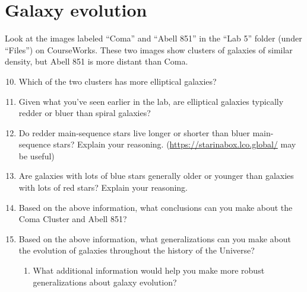 \documentclass[11pt]{article}
\begin{document}
\section{Galaxy evolution}
Look at the images labeled ``Coma'' and ``Abell 851'' in the ``Lab 5'' folder (under ``Files'') on CourseWorks. These two images show clusters of galaxies of similar density, but Abell 851 is more distant than Coma.
    \begin{enumerate}
    \setcounter{enumi}{9}
        \item Which of the two clusters has more elliptical galaxies?
        
        \item Given what you've seen earlier in the lab, are elliptical galaxies typically redder or bluer than spiral galaxies?
        
        \item Do redder main-sequence stars live longer or shorter than bluer main-sequence stars? Explain your reasoning. (\url{https://starinabox.lco.global/} may be useful)

        \item Are galaxies with lots of blue stars generally older or younger than galaxies with lots of red stars? Explain your reasoning.
        
        \item Based on the above information, what conclusions can you make about the Coma Cluster and Abell 851?
        
        \item Based on the above information, what generalizations can you make about the evolution of galaxies throughout the history of the Universe?
        \begin{enumerate}
            \item What additional information would help you make more robust generalizations about galaxy evolution?
        \end{enumerate}
    \end{enumerate}


\end{document}

